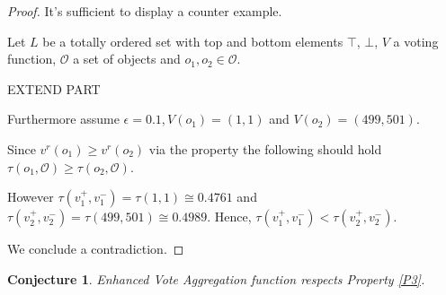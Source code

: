 \documentclass{article}
\newtheorem{conjecture}{Conjecture}
\newcommand{\valueset}{L}
\newcommand{\obj}{\mathcal{O}} %
\begin{document}
\begin{proof}
It's sufficient to display a counter example.

Let  $\valueset$ be a totally ordered set with top and bottom elements $\top$, $\bot$, $V$ a voting function, $\obj$ a set of objects and $o_1, o_2 \in \obj$.

EXTEND PART

Furthermore assume $\epsilon = 0.1, V(o_1) = (1, 1)$ and $V(o_2) = (499, 501).$ 

Since $v^{r}(o_{1}) \ge v^{r}(o_{2})$ via the property the following should hold $\tau(o_{1}, \obj) \ge \tau(o_{2},\obj)$.

However $\tau(v_1^{+}, v_1^{-}) = \tau(1, 1) \cong 0.4761$ and  $\tau(v_2^{+}, v_2^{-}) = \tau(499, 501) \cong 0.4989$.
Hence, $\tau(v_1^{+}, v_1^{-}) < \tau(v_2^{+}, v_2^{-})$.

We conclude a contradiction.
\end{proof}

\begin{conjecture}
Enhanced Vote Aggregation function respects Property \ref{P3}.
\end{conjecture}




\begin{comment}
{\color{teal}
 
\emph{Pointers for discussion:} 
\begin{itemize}
\item
\end{itemize}
}
\end{comment}
\end{document}
